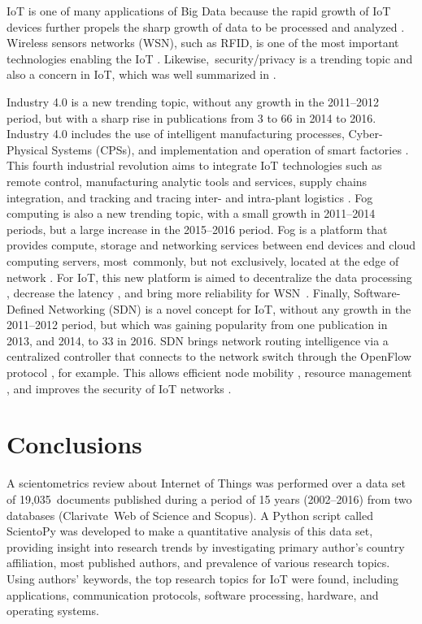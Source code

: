 \documentclass[symmetry,article,accept,moreauthors,pdftex10pt,a4paper]{mdpi}
\begin{document}
IoT is one of many applications of Big Data because the rapid growth of IoT devices further propels the sharp growth of data to be processed and analyzed \cite{Chen2014171}. Wireless sensors networks (WSN), such as RFID, is one of the most important technologies enabling the IoT \cite{ROMAN2011147}. Likewise,~security/privacy is a trending topic and also a concern in IoT, which was well summarized in \cite{Ziegeldorf20142728}.

Industry 4.0 is a new trending topic, without any growth in the 2011--2012 period, but with a sharp rise in publications from 3 to 66 in 2014 to 2016. Industry 4.0 includes the use of intelligent manufacturing processes, Cyber-Physical Systems (CPSs), and implementation and operation of smart factories \cite{7382284}. This fourth industrial revolution aims to integrate IoT technologies such as remote control, manufacturing analytic tools and services, supply chains integration, and tracking and tracing inter- and intra-plant logistics \cite{Weinberger2016699}. Fog computing is also a new trending topic, with a small growth in 2011--2014 periods, but a large increase in the 2015--2016 period. Fog is a platform that provides compute, storage and networking services between end devices and cloud computing servers, most~commonly, but not exclusively, located at the edge of network \cite{Bonomi201213}. For IoT, this new platform is aimed to decentralize the data processing \cite{Gonzalez2017}, decrease the latency \cite{7548853}, and bring more reliability for WSN~\cite{6623445}. Finally, Software-Defined Networking (SDN) is a novel concept for IoT, without any growth in the 2011--2012 period, but which was gaining popularity from one publication in 2013, and 2014, to 33 in 2016. SDN brings network routing intelligence via a centralized controller that connects to the network switch through the OpenFlow protocol \cite{Flauzac2015688}, for example. This allows efficient node mobility \cite{Oh2016}, resource management \cite{7365931}, and improves the security of IoT networks \cite{Vilalta2016,Flauzac2015688,Hafeez201655}.


\section{Conclusions}

A scientometrics review about Internet of Things was performed over a data set of 19,035~documents published during a period of 15 years (2002--2016) from two databases (Clarivate~Web of Science and Scopus). A Python script called ScientoPy was developed to make a quantitative analysis of this data set, providing insight into research trends by investigating primary author's country affiliation, most published authors, and prevalence of various research topics. Using authors' keywords, the top research topics for IoT were found, including applications, communication protocols, software processing, hardware, and operating systems.  
\end{document}
